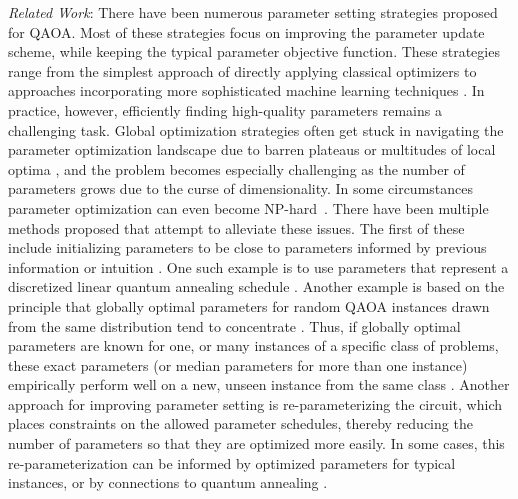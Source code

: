 \documentclass[superscriptaddress,pra,aps,10pt,longbibliography,notitlepage]{revtex4-1}
\begin{document}
\emph{Related Work}: There have been numerous parameter setting strategies proposed for QAOA. Most of these strategies focus on improving the parameter update scheme, while keeping the typical parameter objective function. These strategies range from the simplest approach of directly applying classical optimizers to approaches incorporating more sophisticated machine learning techniques \cite{khairy20, zhou20, crooks18, shaydulin19, alam2020accelerating, verdon19, wilson21,  skolik2021layerwise, rivera2021avoiding}. In practice, however, efficiently finding high-quality parameters remains a challenging task. Global optimization strategies often get stuck in navigating the parameter optimization landscape due to barren plateaus \cite{mcclean18, wang21, larocca22} or multitudes of local optima \cite{cerezo21, wierichs20}, and the problem becomes especially challenging as the number of parameters grows due to the curse of dimensionality. In some circumstances parameter optimization can even become NP-hard~\cite{bittel2021training}. There have been multiple methods proposed that attempt to alleviate these issues. The first of these include initializing parameters to be close to parameters informed by previous information or intuition \cite{streif20, shaydulin21_symmetries, brady21}. One such example is to use parameters that represent a discretized linear quantum annealing schedule \cite{sack21, wurtz21_counteradiabaticity}. Another example is based on the principle that globally optimal parameters for random QAOA instances drawn from the same distribution tend to concentrate \cite{brandao18, farhi14, zhou20, lee21}. Thus, if globally optimal parameters are known for one, or many instances of a specific class of problems, these exact parameters (or median parameters for more than one instance) empirically perform well on a new, unseen instance from the same class \cite{galda21, shaydulin21_qaoakit}. Another approach for improving parameter setting is re-parameterizing the circuit, which places constraints on the allowed parameter schedules, thereby reducing the number of parameters so that they are optimized more easily. In some cases, this re-parameterization can be informed by optimized parameters for typical instances, or by connections to quantum annealing \cite{zhou20, brady2021behavior, brady21, shaydulin21_symmetries, wurtz21_counteradiabaticity}. 
\end{document}
